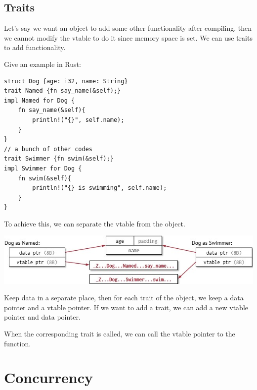 \documentclass[letterpaper,12pt]{article}
\begin{document}
\subsection{Traits}
Let's say we want an object to add some other functionality after compiling, then we cannot modify the vtable to do it since memory space is set. We can use traits to add functionality.

Give an example in Rust:
\begin{lstlisting}
struct Dog {age: i32, name: String}
trait Named {fn say_name(&self);}
impl Named for Dog {
    fn say_name(&self){
        println!("{}", self.name);
    }
}
// a bunch of other codes 
trait Swimmer {fn swim(&self);}
impl Swimmer for Dog {
    fn swim(&self){
        println!("{} is swimming", self.name);
    }
}
\end{lstlisting}

To achieve this, we can separate the vtable from the object. 

\includegraphics*{./Images/Rust traits.jpg}

Keep data in a separate place, then for each trait of the object, we keep a data pointer and a vtable pointer. If we want to add a trait, we can add a new vtable pointer and data pointer.

When the corresponding trait is called, we can call the vtable pointer to the function.
\section{Concurrency}
\end{document}
